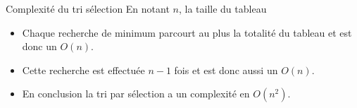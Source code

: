 \documentclass[10pt]{beamer}
\begin{document}
\begin{frame}[fragile]{\Ctitle}{\stitle}
    \begin{exampleblock}{Complexité du tri sélection}
        En notant $n$, la taille du tableau
        \begin{itemize}
            \item<1-> Chaque recherche de minimum parcourt au plus la totalité du tableau et est donc un $O(n)$.
            \item<2-> Cette recherche est effectuée $n-1$ fois et est donc aussi un $O(n)$.
            \item<3-> En conclusion la tri par sélection a un complexité en $O(n^2)$.
        \end{itemize}
    \end{exampleblock}
\end{frame}
\end{document}
